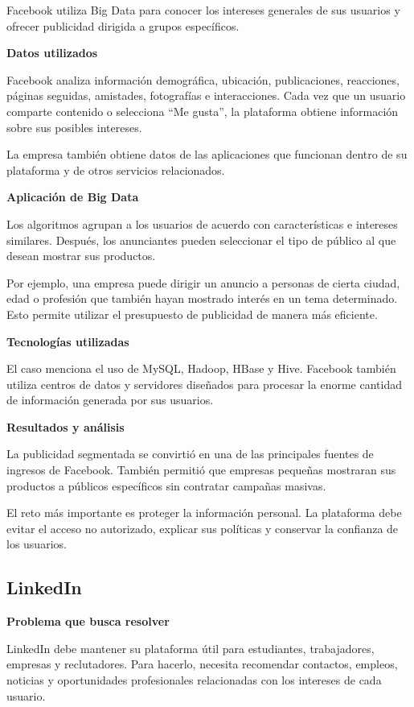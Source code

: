 Facebook utiliza Big Data para conocer los intereses generales de sus usuarios y ofrecer publicidad dirigida a grupos específicos.

\textbf{Datos utilizados}

Facebook analiza información demográfica, ubicación, publicaciones, reacciones, páginas seguidas, amistades, fotografías e interacciones. Cada vez que un usuario comparte contenido o selecciona ``Me gusta'', la plataforma obtiene información sobre sus posibles intereses.

La empresa también obtiene datos de las aplicaciones que funcionan dentro de su plataforma y de otros servicios relacionados.

\textbf{Aplicación de Big Data}

Los algoritmos agrupan a los usuarios de acuerdo con características e intereses similares. Después, los anunciantes pueden seleccionar el tipo de público al que desean mostrar sus productos.

Por ejemplo, una empresa puede dirigir un anuncio a personas de cierta ciudad, edad o profesión que también hayan mostrado interés en un tema determinado. Esto permite utilizar el presupuesto de publicidad de manera más eficiente.

\textbf{Tecnologías utilizadas}

El caso menciona el uso de MySQL, Hadoop, HBase y Hive. Facebook también utiliza centros de datos y servidores diseñados para procesar la enorme cantidad de información generada por sus usuarios.

\textbf{Resultados y análisis}

La publicidad segmentada se convirtió en una de las principales fuentes de ingresos de Facebook. También permitió que empresas pequeñas mostraran sus productos a públicos específicos sin contratar campañas masivas.

El reto más importante es proteger la información personal. La plataforma debe evitar el acceso no autorizado, explicar sus políticas y conservar la confianza de los usuarios.

\subsection{LinkedIn}

\textbf{Problema que busca resolver}

LinkedIn debe mantener su plataforma útil para estudiantes, trabajadores, empresas y reclutadores. Para hacerlo, necesita recomendar contactos, empleos, noticias y oportunidades profesionales relacionadas con los intereses de cada usuario.

